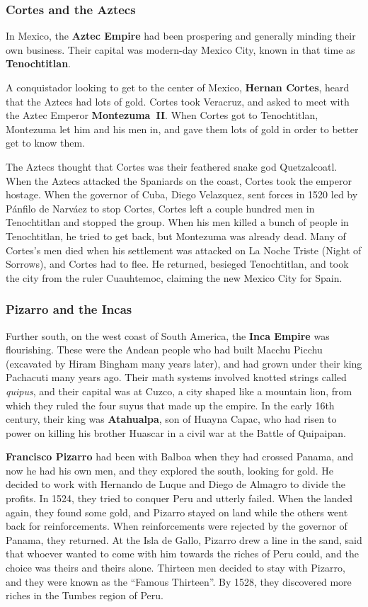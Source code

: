 \subsubsection*{Cortes and the Aztecs}

In Mexico, the \textbf{Aztec Empire} had been prospering and generally minding their own business.
Their capital was modern-day Mexico City, known in that time as \textbf{Tenochtitlan}.

A conquistador looking to get to the center of Mexico,
\textbf{Hernan Cortes}, heard that the Aztecs had lots of gold.
Cortes took Veracruz, and asked to meet with the Aztec Emperor \textbf{Montezuma~II}.
When Cortes got to Tenochtitlan, Montezuma let him and his men in,
and gave them lots of gold in order to better get to know them.

The Aztecs thought that Cortes was their feathered snake god Quetzalcoatl.
When the Aztecs attacked the Spaniards on the coast, Cortes took the emperor hostage.
When the governor of Cuba, Diego Velazquez, sent forces in 1520 led by P\'anfilo de Narv\'aez to stop Cortes,
Cortes left a couple hundred men in Tenochtitlan and stopped the group.
When his men killed a bunch of people in Tenochtitlan,
he tried to get back, but Montezuma was already dead.
Many of Cortes's men died when his settlement was attacked on La Noche Triste (Night of Sorrows),
and Cortes had to flee.
He returned, besieged Tenochtitlan, and took the city from the ruler Cuauhtemoc,
claiming the new Mexico City for Spain.

\subsubsection*{Pizarro and the Incas}

Further south, on the west coast of South America, the \textbf{Inca Empire} was flourishing.
These were the Andean people who had built Macchu Picchu (excavated by Hiram Bingham many years later),
and had grown under their king Pachacuti many years ago.
Their math systems involved knotted strings called \textit{quipus},
and their capital was at Cuzco, a city shaped like a mountain lion,
from which they ruled the four suyus that made up the empire.
In the early 16th century, their king was \textbf{Atahualpa}, son of Huayna Capac,
who had risen to power on killing his brother Huascar in a civil war at the Battle of Quipaipan.

\textbf{Francisco Pizarro} had been with Balboa when they had crossed Panama,
and now he had his own men, and they explored the south, looking for gold.
He decided to work with Hernando de Luque and Diego de Almagro to divide the profits.
In 1524, they tried to conquer Peru and utterly failed.
When the landed again, they found some gold,
and Pizarro stayed on land while the others went back for reinforcements.
When reinforcements were rejected by the governor of Panama, they returned.
At the Isla de Gallo, Pizarro drew a line in the sand,
said that whoever wanted to come with him towards the riches of Peru could,
and the choice was theirs and theirs alone.
Thirteen men decided to stay with Pizarro, and they were known as the ``Famous Thirteen''.
By 1528, they discovered more riches in the Tumbes region of Peru.

